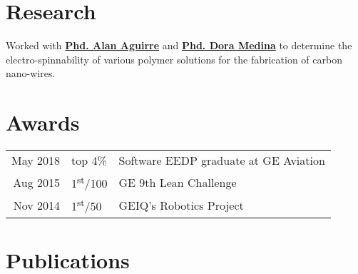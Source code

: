\documentclass[]{deedy-resume-openfont}
\begin{document}
\begin{minipage}[t]{0.65\textwidth}
\section{Research}
Worked with \textbf{\href{https://orcid.org/0000-0003-0455-5401}{Phd. Alan Aguirre}} and \textbf{\href{https://orcid.org/0000-0001-5325-0079}{Phd. Dora Medina}} to determine the electro-spinnability of various polymer solutions for the fabrication of carbon nano-wires.
\sectionsep


\section{Awards} 
\begin{tabular}{rll}
May 2018	& top 4\%                   & Software EEDP graduate at GE Aviation\\
Aug 2015	& 1\textsuperscript{st}/100 & GE 9th Lean Challenge\\
Nov 2014	& 1\textsuperscript{st}/50  & GEIQ’s Robotics Project\\
\end{tabular}
\sectionsep


\section{Publications} 
\vspace{\topsep} %
\vspace{\topsep} %


\nocite{*}

\end{minipage}

\vfill
\end{document}
